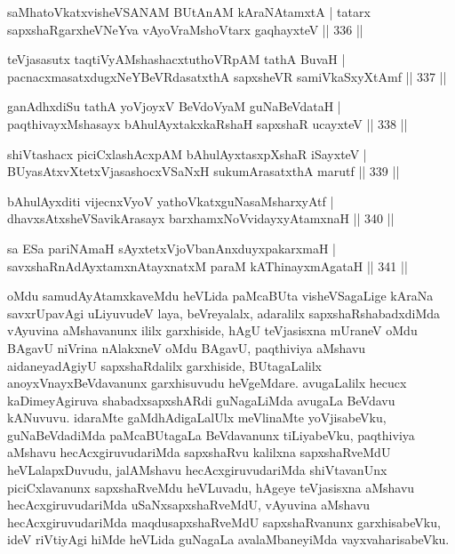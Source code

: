 \begin{shl}
saMhatoVkatxvisheVSANAM BUtAnAM kAraNAtamxtA |
tatarx sapxshaRgarxheVNeYva vAyoVraMshoV\s tarx gaqhayxteV \hfill || 336 ||
\end{shl}

\begin{shl}
teVjasasutx taqtiVyAMshashacxtuthoVR\s pAM tathA BuvaH |
pacnacxmasatxdugxNeYBeVRdasatxthA sapxsheVR samiVkaSxyXtAmf \hfill || 337 ||
\end{shl}

\begin{shl}
ganAdhxdiSu tathA yoVjoyxV BeVdoV\s yaM guNaBeVdataH |
paqthivayxMshasayx bAhulAyxtakxkaRshaH sapxshaR ucayxteV \hfill || 338 ||
\end{shl}

\begin{shl}
shiVtashacx piciCxlashAcxpAM bAhulAyxtasxpXshaR iSayxteV |
BUyasAtxvXtetxVjasashocxVSaNxH sukumArasatxthA marutf \hfill || 339 ||
\end{shl}

\begin{shl}
bAhulAyxditi vijecnxVyoV yathoVkatxguNasaMsharxyAtf |
dhavxsAtxsheVSavikArasayx barxhamxNoV\s vidayxyA\s \s tamxnaH \hfill || 340 ||
\end{shl}

\begin{shl}
sa ESa pariNAmaH sAyxtetxVjoVbanAnxduyxpakarxmaH |
savxshaRnAdAyxtamxnA\s tayxnatxM paraM kAThinayxmAgataH \hfill || 341 ||
\end{shl}

\begin{artha}
oMdu samudAyAtamxkaveMdu heVLida paMcaBUta visheVSagaLige kAraNa savxrUpavAgi uLiyuvudeV laya, beVreyalalx, adaralilx sapxshaRshabadxdiMda vAyuvina aMshavanunx ililx garxhiside, hAgU teVjasisxna mUraneV oMdu BAgavU niVrina nAlakxneV oMdu BAgavU, paqthiviya aMshavu aidaneyadAgiyU sapxshaRdalilx garxhiside, BUtagaLalilx anoyxVnayxBeVdavanunx garxhisuvudu heVgeMdare. avugaLalilx hecucx kaDimeyAgiruva shabadxsapxshARdi guNagaLiMda avugaLa BeVdavu kANuvuvu. idaraMte gaMdhAdigaLalUlx meVlinaMte yoVjisabeVku, guNaBeVdadiMda paMcaBUtagaLa BeVdavanunx tiLiyabeVku, paqthiviya aMshavu hecAcxgiruvudariMda sapxshaRvu kalilxna sapxshaRveMdU heVLalapxDuvudu, jalAMshavu hecAcxgiruvudariMda shiVtavanUnx piciCxlavanunx sapxshaRveMdu heVLuvadu, hAgeye teVjasisxna aMshavu hecAcxgiruvudariMda uSaNxsapxshaRveMdU, vAyuvina aMshavu hecAcxgiruvudariMda maqdusapxshaRveMdU sapxshaRvanunx garxhisabeVku, ideV riVtiyAgi hiMde heVLida guNagaLa avalaMbaneyiMda vayxvaharisabeVku.	
\end{artha}

